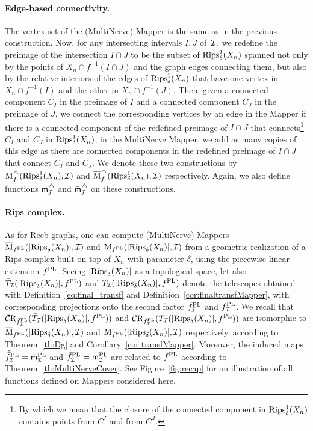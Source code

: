 \paragraph*{Edge-based connectivity.}
The vertex set of the (MultiNerve) Mapper is the same as in the
previous construction. Now, for any intersecting intervals $I,J$
of~$\mathcal{I}$, we redefine the preimage of the intersection $I\cap J$ to be
the subset of $\mathrm{Rips}^1_\delta(X_n)$ spanned not only by the points of
$X_n\cap f^{-1}(I\cap J)$ and the graph edges connecting them, but also by
the relative interiors of the edges of $\mathrm{Rips}^1_\delta(X_n)$ that have
one vertex in $X_n\cap f^{-1}(I)$ and the other in $X_n\cap f^{-1}(J)$. Then, given a
connected component $C_I$ in the preimage of $I$ and a connected component $C_J$ in the preimage of $J$,
we connect the corresponding vertices by an edge in the Mapper if
there is a connected component of the redefined preimage of $I\cap J$ that
connects\footnote{By which we mean that the closure of the connected component in
  $\mathrm{Rips}^1_\delta(X_n)$ contains points from $C^I$ and from $C^J$.}
$C_I$ and $C_J$ in $\mathrm{Rips}^1_\delta(X_n)$; in the MultiNerve Mapper, we
add as many copies of this edge as there are connected components in the redefined
preimage of $I\cap J$ that connect $C_I$ and $C_J$. We denote these
two constructions by ${\rm M}^\triangle_f(\mathrm{Rips}^1_\delta(X_n), \mathcal{I})$ and
$\overline{\rm M}^\triangle_f(\mathrm{Rips}^1_\delta(X_n), \mathcal{I})$ respectively.
Again, we also define functions ${\sf m}_{\mathcal I}^\triangle$ and $\bar {\sf{m}}_{\mathcal I}^\triangle$ on these
constructions. %



\paragraph*{Rips complex.} As for Reeb graphs, one can compute (MultiNerve) Mappers
$\overline{\mathrm{M}}_{f^{\rm PL}}(|\mathrm{Rips}_\delta(X_n)|,\mathcal{I})$ and $\mathrm{M}_{f^{\rm PL}}(|\mathrm{Rips}_\delta(X_n)|,\mathcal{I})$
from a geometric realization of a Rips complex built on top of $X_n$ with parameter $\delta$,
using the piecewise-linear extension $f^{\rm PL}$.  Seeing $|\mathrm{Rips}_\delta(X_n)|$ as a topological space, 
let also $\bar T_{\mathcal I}(|\mathrm{Rips}_\delta(X_n)|,f^{\rm PL})$ %
and  $T_{\mathcal I}(|\mathrm{Rips}_\delta(X_n)|,f^{\rm PL})$ %
denote the telescopes obtained
with Definition~\ref{eq:final_transf} and Definition~\ref{cor:finaltransfMapper},
with corresponding projections onto the second factor $\bar{f}^{\rm PL}_{\mathcal I}$ and $f^{\rm PL}_{\mathcal I}$.
We recall that $\mathcal{C}\mathrm{R}_{\bar{f}^{\rm PL}_{\mathcal I}}(\bar T_{\mathcal I}(|\mathrm{Rips}_\delta(X_n)|,f^{\rm PL}))$
and $\mathcal{C}\mathrm{R}_{f^{\rm PL}_{\mathcal I}}(T_{\mathcal I}(|\mathrm{Rips}_\delta(X_n)|,f^{\rm PL}))$ are isomorphic
to $\overline{\mathrm{M}}_{f^{\rm PL}}(|\mathrm{Rips}_\delta(X_n)|,\mathcal{I})$ and $\mathrm{M}_{f^{\rm PL}}(|\mathrm{Rips}_\delta(X_n)|,\mathcal{I})$
respectively, according to Theorem~\ref{th:Dg} and Corollary~\ref{cor:transfMapper}.
Moreover, the induced maps $\tilde{\bar f}^{\rm PL}_{\mathcal{I}}=\bar{\sf{m}}^{\rm PL}_{\mathcal I}$ and $\tilde f^{\rm PL}_{\mathcal{I}}={\sf{m}^{\rm PL}_{\mathcal I}}$
are related to ${\tilde{f}}^{\rm PL}$ according to Theorem~\ref{th:MultiNerveCover}.
See Figure~\ref{fig:recap} for an illustration of all functions defined on Mappers considered here. 

